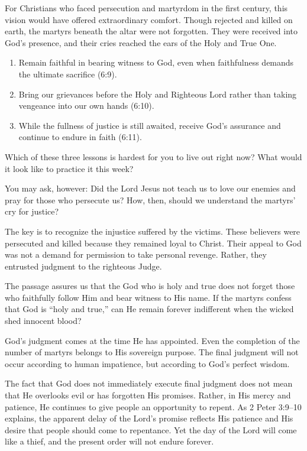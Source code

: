 For Christians who faced persecution and martyrdom in the first century, this vision would have offered extraordinary comfort. Though rejected and killed on earth, the martyrs beneath the altar were not forgotten. They were received into God's presence, and their cries reached the ears of the Holy and True One.


\begin{ReaderQuestion}
\begin{enumerate}
\item Remain faithful in bearing witness to God, even when faithfulness demands the ultimate sacrifice (6:9).
\item Bring our grievances before the Holy and Righteous Lord rather than taking vengeance into our own hands (6:10).
\item While the fullness of justice is still awaited, receive God's assurance and continue to endure in faith (6:11).
\end{enumerate}

\smallskip
Which of these three lessons is hardest for you to live out right now? What would it look like to practice it this week?
\end{ReaderQuestion}

You may ask, however: Did the Lord Jesus not teach us to love our enemies and pray for those who persecute us? How, then, should we understand the martyrs' cry for justice?

The key is to recognize the injustice suffered by the victims. These believers were persecuted and killed because they remained loyal to Christ. Their appeal to God was not a demand for permission to take personal revenge. Rather, they entrusted judgment to the righteous Judge.

The passage assures us that the God who is holy and true does not forget those who faithfully follow Him and bear witness to His name. If the martyrs confess that God is ``holy and true,'' can He remain forever indifferent when the wicked shed innocent blood?

God's judgment comes at the time He has appointed. Even the completion of the number of martyrs belongs to His sovereign purpose. The final judgment will not occur according to human impatience, but according to God's perfect wisdom.

The fact that God does not immediately execute final judgment does not mean that He overlooks evil or has forgotten His promises. Rather, in His mercy and patience, He continues to give people an opportunity to repent. As 2 Peter 3:9--10 explains, the apparent delay of the Lord's promise reflects His patience and His desire that people should come to repentance. Yet the day of the Lord will come like a thief, and the present order will not endure forever.

